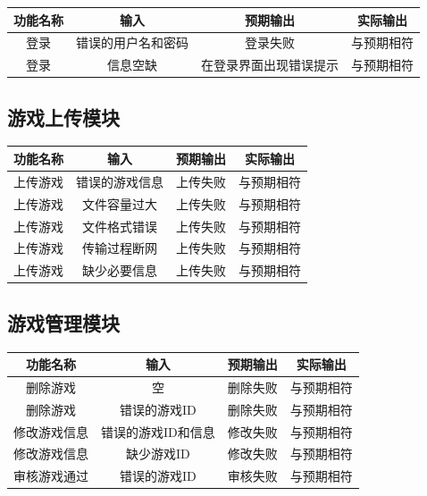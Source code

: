 \documentclass[12pt]{ctexart} %
\begin{document}
\begin{table}[H]
\centering
\begin{tabular}{|c|c|c|c|}
  \hline
  功能名称 & 输入 & 预期输出 & 实际输出 \\
  \hline
  登录 & 错误的用户名和密码 & 登录失败 & 与预期相符 \\
  \hline
  登录 & 信息空缺 & 在登录界面出现错误提示 & 与预期相符 \\
  \hline
  \end{tabular}
\end{table}

\subsection{游戏上传模块}

\begin{table}[H]
  \centering
  \begin{tabular}{|c|c|c|c|}
    \hline
    功能名称 & 输入 & 预期输出 & 实际输出 \\
    \hline
    上传游戏 & 错误的游戏信息 & 上传失败 & 与预期相符 \\
    \hline
    上传游戏 & 文件容量过大 & 上传失败 & 与预期相符 \\
    \hline
    上传游戏 & 文件格式错误 & 上传失败 & 与预期相符 \\
    \hline
    上传游戏 & 传输过程断网 & 上传失败 & 与预期相符 \\
    \hline
    上传游戏 & 缺少必要信息 & 上传失败 & 与预期相符 \\
    \hline
  \end{tabular}
\end{table}

\subsection{游戏管理模块}

\begin{table}[H]
  \centering
  \begin{tabular}{|c|c|c|c|}
    \hline
    功能名称 & 输入 & 预期输出 & 实际输出 \\
    \hline
    删除游戏 & 空 & 删除失败 & 与预期相符 \\
    \hline
    删除游戏 & 错误的游戏ID & 删除失败 & 与预期相符 \\
    \hline
    修改游戏信息 & 错误的游戏ID和信息 & 修改失败 & 与预期相符 \\
    \hline
    修改游戏信息 & 缺少游戏ID & 修改失败 & 与预期相符 \\
    \hline
    审核游戏通过 & 错误的游戏ID & 审核失败 & 与预期相符 \\
    \hline
  \end{tabular}
\end{table}
\end{document}
